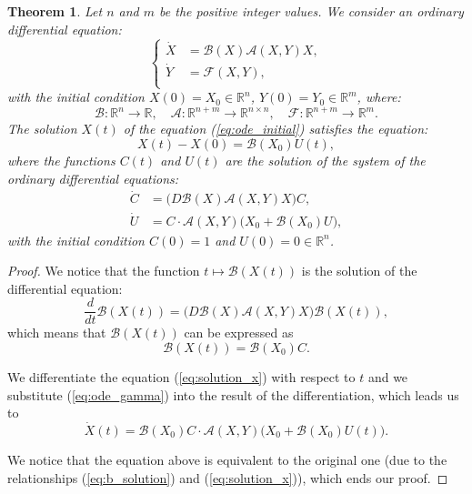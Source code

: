 \documentclass[1p]{article}
\newtheorem{theorem}{Theorem}
\begin{document}
\begin{theorem}
    \label{thm:exp_trick}
    Let $n$ and $m$ be the positive integer values. We consider an ordinary differential equation:
    \begin{equation}
        \label{eq:ode_initial}
        \begin{cases}
            \dot{X} &= \mathcal{B}(X) \mathcal{A}(X,Y) X, \\
            \dot{Y} &= \mathcal{F}(X,Y), \\
        \end{cases}
    \end{equation}
    with the initial condition $X(0) = X_0 \in \mathbb{R}^n$, $Y(0) = Y_0 \in \mathbb{R}^m$, where:
    \[
        \mathcal{B} : \mathbb{R}^n \to \mathbb{R}, \quad
        \mathcal{A} : \mathbb{R}^{n+m} \to \mathbb{R}^{n \times n}, \quad
        \mathcal{F} : \mathbb{R}^{n+m} \to \mathbb{R}^m.
    \]
    The solution $X(t)$ of the equation (\ref{eq:ode_initial}) satisfies the equation:
    \begin{equation}
        \label{eq:solution_x}
        X(t) - X(0) = \mathcal{B}(X_0) U(t),
    \end{equation}
    where the functions $C(t)$ and $U(t)$ are the solution of the system of the ordinary differential equations:
    \begin{align}
        \dot{C} &= \big( D \mathcal{B}(X) \mathcal{A}(X,Y) X \big) C, \label{eq:ode_c} \\
        \dot{U} &= C \cdot \mathcal{A}(X,Y) \big( X_0 + \mathcal{B}(X_0) U \big), \label{eq:ode_gamma}
    \end{align}
    with the initial condition $C(0) = 1$ and $U(0) = 0 \in \mathbb{R}^n$.
\end{theorem}
\begin{proof}
    We notice that the function $t \mapsto \mathcal{B}(X(t))$ is the solution of the differential equation:
    \begin{equation}
        \label{eq:ode_b}
        \frac{d}{dt} \mathcal{B}(X(t)) = \big( D \mathcal{B}( X ) \mathcal{A}(X,Y) X \big) \mathcal{B}(X(t)),
    \end{equation}
    which means that $\mathcal{B}(X(t))$ can be expressed as
    \begin{equation}
        \label{eq:b_solution}
        \mathcal{B}(X(t)) = \mathcal{B}(X_0) C.
    \end{equation}

    We differentiate the equation (\ref{eq:solution_x}) with respect to $t$ and we substitute (\ref{eq:ode_gamma}) into the result of the differentiation, which leads us to
    \begin{equation}
        \label{eq:ode_x_2}
        \dot{X}(t) = \mathcal{B}(X_0) C \cdot \mathcal{A}(X,Y) \big( X_0 + \mathcal{B}(X_0) U(t) \big).
    \end{equation}

    We notice that the equation above is equivalent to the original one (due to the relationships (\ref{eq:b_solution}) and (\ref{eq:solution_x})), which ends our proof.
\end{proof}
\end{document}
